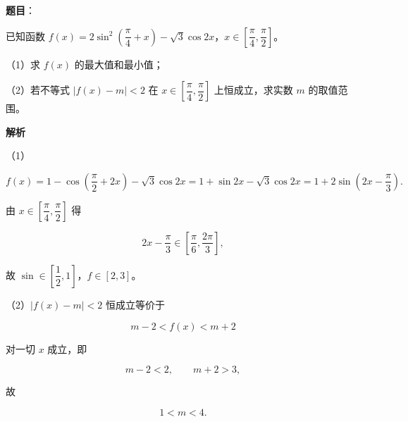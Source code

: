 \begin{answer}

\textbf{题目}：

已知函数 $f(x)=2\sin^2\left(\dfrac{\pi}{4}+x\right)-\sqrt3\cos2x$，$x\in\left[\dfrac{\pi}{4},\dfrac{\pi}{2}\right]$。

（1）求 $f(x)$ 的最大值和最小值；

（2）若不等式 $|f(x)-m|<2$ 在 $x\in\left[\dfrac{\pi}{4},\dfrac{\pi}{2}\right]$ 上恒成立，求实数 $m$ 的取值范围。

\textbf{解析}

（1）

\nopagebreak[4]
\[f(x)=1-\cos\left(\frac{\pi}{2}+2x\right)-\sqrt3\cos2x
=1+\sin2x-\sqrt3\cos2x
=1+2\sin\left(2x-\frac{\pi}{3}\right).\]

由 $x\in\left[\dfrac{\pi}{4},\dfrac{\pi}{2}\right]$ 得

\nopagebreak[4]
\[2x-\frac{\pi}{3}\in\left[\frac{\pi}{6},\frac{2\pi}{3}\right],\]

故 $\sin\in\left[\dfrac12,1\right]$，$f\in[2,3]$。

（2）$|f(x)-m|<2$ 恒成立等价于

\nopagebreak[4]
\[m-2<f(x)<m+2\]

对一切 $x$ 成立，即

\nopagebreak[4]
\[m-2<2,\qquad m+2>3,\]

故

\nopagebreak[4]
\[1<m<4.\]


\end{answer}
